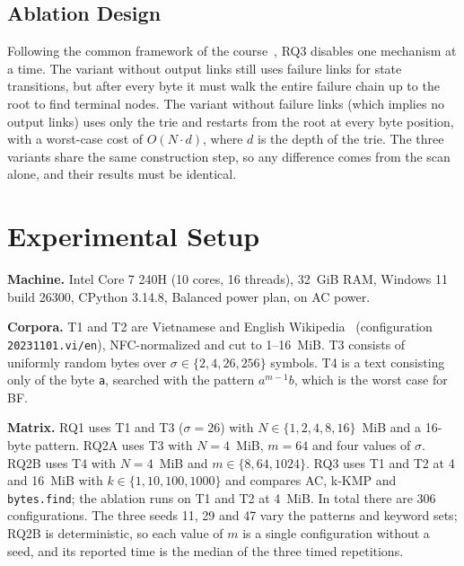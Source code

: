 \documentclass[conference]{IEEEtran}
\begin{document}
\subsection{Ablation Design}
Following the common framework of the course~\cite{rules}, RQ3 disables one mechanism at a time. The variant without output links still uses failure links for state transitions, but after every byte it must walk the entire failure chain up to the root to find terminal nodes. The variant without failure links (which implies no output links) uses only the trie and restarts from the root at every byte position, with a worst-case cost of $O(N\cdot d)$, where $d$ is the depth of the trie. The three variants share the same construction step, so any difference comes from the scan alone, and their results must be identical.

\section{Experimental Setup}
\textbf{Machine.} Intel Core 7 240H (10 cores, 16 threads), 32~GiB RAM, Windows 11 build 26300, CPython 3.14.8, Balanced power plan, on AC power.

\textbf{Corpora.} T1 and T2 are Vietnamese and English Wikipedia~\cite{wiki} (configuration \texttt{20231101.vi/en}), NFC-normalized and cut to 1--16~MiB. T3 consists of uniformly random bytes over $\sigma\in\{2,4,26,256\}$ symbols. T4 is a text consisting only of the byte \texttt{a}, searched with the pattern $a^{m-1}b$, which is the worst case for BF.

\textbf{Matrix.} RQ1 uses T1 and T3 ($\sigma=26$) with $N\in\{1,2,4,8,16\}$~MiB and a 16-byte pattern. RQ2A uses T3 with $N=4$~MiB, $m=64$ and four values of $\sigma$. RQ2B uses T4 with $N=4$~MiB and $m\in\{8,64,1024\}$. RQ3 uses T1 and T2 at 4 and 16~MiB with $k\in\{1,10,100,1000\}$ and compares AC, k-KMP and \texttt{bytes.find}; the ablation runs on T1 and T2 at 4~MiB. In total there are 306 configurations. The three seeds 11, 29 and 47 vary the patterns and keyword sets; RQ2B is deterministic, so each value of $m$ is a single configuration without a seed, and its reported time is the median of the three timed repetitions.
\end{document}

